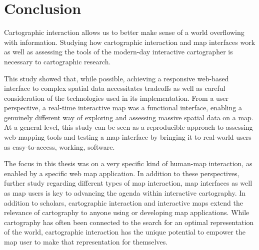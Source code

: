 \section{Conclusion}

Cartographic interaction allows us to better make sense of a world overflowing with information.
Studying how cartographic interaction and map interfaces work
as well as assessing the tools of the modern-day interactive cartographer
is necessary to cartographic research.

This study showed that, while possible, achieving a responsive web-based interface to complex spatial data
necessitates tradeoffs as well as careful consideration of the technologies used in its implementation.
From a user perspective, a real-time interactive map was a functional interface,
enabling a genuinely different way of exploring and assessing massive spatial data on a map.
At a general level,
this study can be seen as a reproducible approach to assessing web-mapping tools
and testing a map interface by bringing it to real-world users as easy-to-access,
working, software.

The focus in this thesis was on a very specific kind of human-map interaction,
as enabled by a specific web map application.
In addition to these perspectives,
further study regarding different types of map interaction, map interfaces as well as map users is key
to advancing the agenda within interactive cartography.
In addition to scholars,
cartographic interaction and interactive maps extend the relevance of cartography to
anyone using or developing map applications.
While cartography has often been connected to the search for
an optimal representation of the world,
cartographic interaction
has the unique potential to empower the map user to make that representation for themselves.




